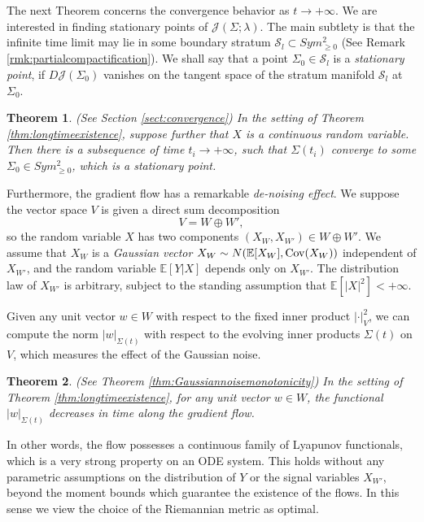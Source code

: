 \documentclass[a4paper]{article}
\newcommand{\Cov}{{\rm Cov}}
\newtheorem{thm}{Theorem}[section]
\theoremstyle{definition}
\newcommand{\E}{\mathbb{E}}
\newcommand{\1}{\mathbbm{1}}
\begin{document}
	
	
	
	
	The next Theorem concerns the convergence behavior as $t\to +\infty$. We are interested in finding stationary points of $\mathcal{J}(\Sigma;\lambda)$. The main subtlety is that the infinite time limit may lie in some boundary stratum $\mathcal{S}_l\subset Sym^2_{\geq 0}$ (See Remark \ref{rmk:partialcompactification}). We shall say that a point $\Sigma_0\in \mathcal{S}_l$ is a \emph{stationary point}, if $D\mathcal{J}(\Sigma_0)$ vanishes on the tangent space of the stratum manifold $\mathcal{S}_l$ at $\Sigma_0$. 
	
	
	
	
	
	\begin{thm}\label{thm:convergence}(See Section \ref{sect:convergence})
		In the setting of Theorem \ref{thm:longtimeexistence}, suppose further that $X$ is a continuous random variable. Then there is a subsequence of time $t_i\to +\infty$, such that $\Sigma(t_i)$ converge to some $\Sigma_0\in Sym^2_{\geq 0}$, which is a \emph{stationary point}.
	\end{thm}
	
	
	
	Furthermore, the gradient flow has a remarkable \emph{de-noising effect}. We suppose the vector space $V$ is given a direct sum decomposition \[
	V=W\oplus W',
	\]
	so the random variable $X$ has two components $(X_W, X_{W'})\in W\oplus W'$. We assume that $X_W$ is a \emph{Gaussian vector} $X_W\sim N(\E[X_W], \Cov(X_W)) $  independent of $X_{W'}$, and the random variable $\E[Y|X]$ depends only on $X_{W'}$. The distribution law of $X_{W'}$ is arbitrary, subject to the standing assumption that  $\E[|X|^2]<+\infty$. 
	
	
	
	
	Given any unit vector $w\in W$ with respect to the fixed inner product $|\cdot|_V^2$,  we can compute the norm $|w|_{\Sigma(t)}$ with respect to the evolving inner products $\Sigma(t)$ on $V$, which measures the effect of the Gaussian noise.
	
	
	\begin{thm}\label{thm:montonicity}(See Theorem \ref{thm:Gaussiannoisemonotonicity}) In the setting of Theorem \ref{thm:longtimeexistence}, 
		for any unit vector $w\in W$, the functional $|w|_{\Sigma(t)}$ decreases in time along the gradient flow.
	\end{thm}
	
	
	In other words, the flow possesses a continuous family of Lyapunov functionals, which is a very strong property on an ODE system. This holds without any parametric assumptions on the distribution of $Y$ or the signal variables $X_{W'}$, beyond the moment bounds which guarantee the existence of the flows. 
	In this sense we view the choice of the Riemannian metric as optimal. 
	
\end{document}
